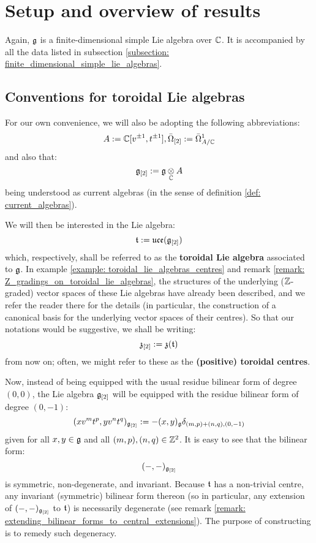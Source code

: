 \section{Setup and overview of results}
    Again, $\mathfrak{g}$ is a finite-dimensional simple Lie algebra over $\mathbb{C}$. It is accompanied by all the data listed in subsection \ref{subsection: finite_dimensional_simple_lie_algebras}. 

    \subsection{Conventions for toroidal Lie algebras} \label{subsection: toroidal_lie_algebra_conventions}
        For our own convenience, we will also be adopting the following abbreviations:
            $$A := \mathbb{C}[v^{\pm 1}, t^{\pm 1}], \bar{\Omega}_{[2]} := \bar{\Omega}^1_{A/\mathbb{C}}$$
        and also that:
            $$\g_{[2]} := \g \tensor_{\bbC} A$$
        being understood as current algebras (in the sense of definition \ref{def: current_algebras}).
    
        We will then be interested in the Lie algebra:
            $$\mathfrak{t} := \mathfrak{uce}(\mathfrak{g}_{[2]})$$
        which, respectively, shall be referred to as the \textbf{toroidal Lie algebra} associated to $\mathfrak{g}$. In example \ref{example: toroidal_lie_algebras_centres} and remark \ref{remark: Z_gradings_on_toroidal_lie_algebras}, the structures of the underlying ($\mathbb{Z}$-graded) vector spaces of these Lie algebras have already been described, and we refer the reader there for the details (in particular, the construction of a canonical basis for the underlying vector spaces of their centres). So that our notations would be suggestive, we shall be writing:
            $$\mathfrak{z}_{[2]} := \mathfrak{z}(\mathfrak{t})$$
        from now on; often, we might refer to these as the \textbf{(positive) toroidal centres}.
        
        Now, instead of being equipped with the usual residue bilinear form of degree $(0, 0)$, the Lie algebra $\mathfrak{g}_{[2]}$ will be equipped with the residue bilinear form of degree $(0, -1)$:
            $$(x v^m t^p, y v^n t^q)_{\mathfrak{g}_{[2]}} := -(x, y)_{\mathfrak{g}} \delta_{(m, p) + (n, q), (0, -1)}$$
        given for all $x, y \in \mathfrak{g}$ and all $(m, p), (n, q) \in \mathbb{Z}^2$. It is easy to see that the bilinear form:
            $$(-, -)_{\mathfrak{g}_{[2]}}$$
        is symmetric, non-degenerate, and invariant. Because $\mathfrak{t}$ has a non-trivial centre, any invariant (symmetric) bilinear form thereon (so in particular, any extension of $(-, -)_{\mathfrak{g}_{[2]}}$ to $\mathfrak{t}$) is necessarily degenerate (see remark \ref{remark: extending_bilinear_forms_to_central_extensions}). The purpose of constructing  is to remedy such degeneracy.

